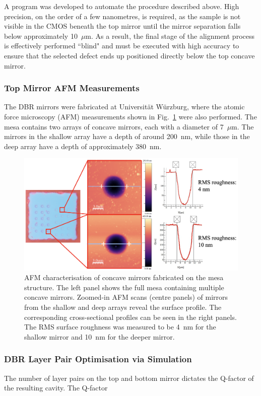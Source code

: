 A program was developed to automate the procedure described above. High precision, on the order of a few nanometres, is required, as the sample is not visible in the CMOS beneath the top mirror until the mirror separation falls below approximately 10~$\mu$m. As a result, the final stage of the alignment process is effectively performed ``blind" and must be executed with high accuracy to ensure that the selected defect ends up positioned directly below the top concave mirror.

\subsubsection{Top Mirror AFM Measurements}

The DBR mirrors were fabricated at Universität Würzburg, where the atomic force microscopy (AFM) measurements shown in Fig.~\ref{fig:AFM-Measurement} were also performed. The mesa contains two arrays of concave mirrors, each with a diameter of 7~$\mu$m. The mirrors in the shallow array have a depth of around 200~nm, while those in the deep array have a depth of approximately 380~nm.

\begin{figure}[h]
    \centering
    \includegraphics[width=0.9\linewidth]{Figures/MirrorAFM.png}
    \caption{AFM characterisation of concave mirrors fabricated on the mesa structure. The left panel shows the full mesa containing multiple concave mirrors. Zoomed-in AFM scans (centre panels) of mirrors from the shallow and deep arrays reveal the surface profile. The corresponding cross-sectional profiles can be seen in the right panels. The RMS surface roughness was measured to be 4~nm for the shallow mirror and 10~nm for the deeper mirror.}
    \label{fig:AFM-Measurement}
\end{figure}


\subsubsection{DBR Layer Pair Optimisation via Simulation}

The number of layer pairs on the top and bottom mirror dictates the Q-factor of the resulting cavity. The Q-factor




\newpage